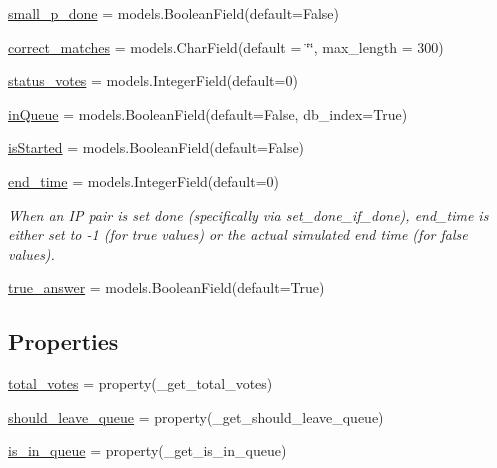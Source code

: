 \begin{DoxyCompactItemize}
\item 
\mbox{\hyperlink{classdynamicfilterapp_1_1models_1_1_i_p___pair_a1010f48fff23c463d3e3da94d9542d02}{small\+\_\+p\+\_\+done}} = models.\+Boolean\+Field(default=False)
\item 
\mbox{\hyperlink{classdynamicfilterapp_1_1models_1_1_i_p___pair_afa7f671131faeb023ff23ff8593cc029}{correct\+\_\+matches}} = models.\+Char\+Field(default = \char`\"{}\char`\"{}, max\+\_\+length = 300)
\item 
\mbox{\hyperlink{classdynamicfilterapp_1_1models_1_1_i_p___pair_a1127c5a8b4c39b02ba8d32d45f1881c3}{status\+\_\+votes}} = models.\+Integer\+Field(default=0)
\item 
\mbox{\hyperlink{classdynamicfilterapp_1_1models_1_1_i_p___pair_af5ba33bf8fddcc8f610ee2d0091ded53}{in\+Queue}} = models.\+Boolean\+Field(default=False, db\+\_\+index=True)
\item 
\mbox{\hyperlink{classdynamicfilterapp_1_1models_1_1_i_p___pair_a4dfad4da8b9c480e78a3ad161ce723f1}{is\+Started}} = models.\+Boolean\+Field(default=False)
\item 
\mbox{\hyperlink{classdynamicfilterapp_1_1models_1_1_i_p___pair_aa18736cc12f8beb112bd108c5a09ef8d}{end\+\_\+time}} = models.\+Integer\+Field(default=0)
\begin{DoxyCompactList}\small\item\em When an IP pair is set done (specifically via set\+\_\+done\+\_\+if\+\_\+done), end\+\_\+time is either set to -\/1 (for true values) or the actual simulated end time (for false values). \end{DoxyCompactList}\item 
\mbox{\hyperlink{classdynamicfilterapp_1_1models_1_1_i_p___pair_ab1306c9f450db4ef7220faa3842affa7}{true\+\_\+answer}} = models.\+Boolean\+Field(default=True)
\end{DoxyCompactItemize}
\subsection*{Properties}
\begin{DoxyCompactItemize}
\item 
\mbox{\hyperlink{classdynamicfilterapp_1_1models_1_1_i_p___pair_a6de192eaff22c17d7eba33f9846d5cc3}{total\+\_\+votes}} = property(\+\_\+get\+\_\+total\+\_\+votes)
\item 
\mbox{\hyperlink{classdynamicfilterapp_1_1models_1_1_i_p___pair_a63cbe78a2b2e4520b738f01642954f9c}{should\+\_\+leave\+\_\+queue}} = property(\+\_\+get\+\_\+should\+\_\+leave\+\_\+queue)
\item 
\mbox{\hyperlink{classdynamicfilterapp_1_1models_1_1_i_p___pair_aa3c0cb873f3a4737bc2c357226618928}{is\+\_\+in\+\_\+queue}} = property(\+\_\+get\+\_\+is\+\_\+in\+\_\+queue)
\end{DoxyCompactItemize}


